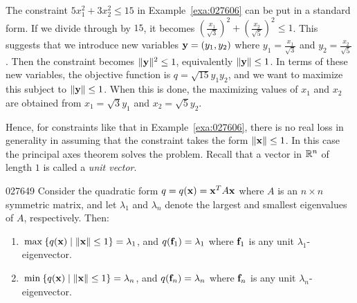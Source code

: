The constraint $5x_{1}^2 + 3x_{2}^2 \leq 15$ in Example~\ref{exa:027606} can be put in a standard form. If we divide through by $15$, it becomes $\left(\frac{x_{1}}{\sqrt{3}}\right)^2 + \left(\frac{x_{2}}{\sqrt{5}}\right)^2 \leq 1$. This suggests that we introduce new variables $\textbf{y} = (y_{1}, y_{2})$ where $y_{1} = \frac{x_{1}}{\sqrt{3}}$ and $y_{2} = \frac{x_{2}}{\sqrt{5}}$. Then the constraint becomes $\|\textbf{y}\|^{2} \leq 1$, equivalently $\|\textbf{y}\| \leq 1$. In terms of these new variables, the objective function is $q = \sqrt{15}y_{1}y_{2}$, and we want to maximize this subject to $\|\textbf{y}\| \leq 1$. When this is done, the maximizing values of $x_{1}$ and $x_{2}$ are obtained from $x_{1} = \sqrt{3}y_{1}$ and $x_{2} = \sqrt{5}y_{2}$.


Hence, for constraints like that in Example~\ref{exa:027606}, there is no real loss in generality in assuming that the constraint takes the form $\|\textbf{x}\| \leq 1$. In this case the principal axes theorem solves the problem. Recall that a vector in $\mathbb{R}^n$ of length $1$ is called a \textit{unit vector}.


\begin{theorem}{}{027649}
Consider the quadratic form $q = q(\textbf{x}) = \textbf{x}^{T}A\textbf{x}$ where $A$ is an $n \times n$ symmetric matrix, and let $\lambda_{1}$ and $\lambda_{n}$ denote the largest and smallest eigenvalues of $A$, respectively. Then:


\begin{enumerate}
\item $\thinspace\operatorname{max\medspace}\{q(\textbf{x}) \mid \|\textbf{x}\| \leq 1\} = \lambda_1$, and $q(\textbf{f}_{1}) = \lambda_1$ where $\textbf{f}_{1}$ is any unit $\lambda_1$-eigenvector.

\item $\thinspace\operatorname{min\medspace}\{q(\textbf{x}) \mid \|\textbf{x}\| \leq 1\} = \lambda_{n}$, and $q(\textbf{f}_{n}) = \lambda_{n}$ where $\textbf{f}_{n}$ is any unit $\lambda_{n}$-eigenvector.

\end{enumerate}
\end{theorem}


